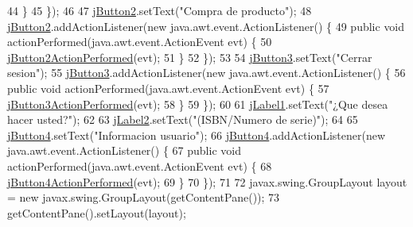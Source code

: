 \begin{DoxyCode}
44             \}
45         \});
46 
47         \mbox{\hyperlink{class_interfaz_package_1_1_interfaz_cliente_a0196e2e1cfcbbbc8861c08f6a0a37ae4}{jButton2}}.setText(\textcolor{stringliteral}{"Compra de producto"});
48         \mbox{\hyperlink{class_interfaz_package_1_1_interfaz_cliente_a0196e2e1cfcbbbc8861c08f6a0a37ae4}{jButton2}}.addActionListener(\textcolor{keyword}{new} java.awt.event.ActionListener() \{
49             \textcolor{keyword}{public} \textcolor{keywordtype}{void} actionPerformed(java.awt.event.ActionEvent evt) \{
50                 \mbox{\hyperlink{class_interfaz_package_1_1_interfaz_cliente_a07223b4b24e57be25514ed5d515a3fae}{jButton2ActionPerformed}}(evt);
51             \}
52         \});
53 
54         \mbox{\hyperlink{class_interfaz_package_1_1_interfaz_cliente_a25b735a55e8862dffce033dda1112430}{jButton3}}.setText(\textcolor{stringliteral}{"Cerrar sesion"});
55         \mbox{\hyperlink{class_interfaz_package_1_1_interfaz_cliente_a25b735a55e8862dffce033dda1112430}{jButton3}}.addActionListener(\textcolor{keyword}{new} java.awt.event.ActionListener() \{
56             \textcolor{keyword}{public} \textcolor{keywordtype}{void} actionPerformed(java.awt.event.ActionEvent evt) \{
57                 \mbox{\hyperlink{class_interfaz_package_1_1_interfaz_cliente_a49bdd2ccad1a21cac6b70a069e440a69}{jButton3ActionPerformed}}(evt);
58             \}
59         \});
60 
61         \mbox{\hyperlink{class_interfaz_package_1_1_interfaz_cliente_a566a82ef3d269cafc1ea835fddd6a92a}{jLabel1}}.setText(\textcolor{stringliteral}{"¿Que desea hacer usted?"});
62 
63         \mbox{\hyperlink{class_interfaz_package_1_1_interfaz_cliente_adddf6bbdd3ebab836af4f159294fd8ff}{jLabel2}}.setText(\textcolor{stringliteral}{"(ISBN/Numero de serie)"});
64 
65         \mbox{\hyperlink{class_interfaz_package_1_1_interfaz_cliente_a724801e1312c508ba148b8928739811e}{jButton4}}.setText(\textcolor{stringliteral}{"Informacion usuario"});
66         \mbox{\hyperlink{class_interfaz_package_1_1_interfaz_cliente_a724801e1312c508ba148b8928739811e}{jButton4}}.addActionListener(\textcolor{keyword}{new} java.awt.event.ActionListener() \{
67             \textcolor{keyword}{public} \textcolor{keywordtype}{void} actionPerformed(java.awt.event.ActionEvent evt) \{
68                 \mbox{\hyperlink{class_interfaz_package_1_1_interfaz_cliente_a2d52e60b1ae90075685a12355727cefd}{jButton4ActionPerformed}}(evt);
69             \}
70         \});
71 
72         javax.swing.GroupLayout layout = \textcolor{keyword}{new} javax.swing.GroupLayout(getContentPane());
73         getContentPane().setLayout(layout);

\end{DoxyCode}
